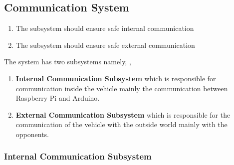 \documentclass[a4paper,12pt]{article}
\begin{document}

\subsection{Communication System}



	\begin{enumerate}
		\item The subsystem should ensure safe internal communication
		\item The subsystem should ensure safe external communication
	\end{enumerate}	


	The system has two subsystems namely, 	,

	\begin{enumerate}
		\item \textbf{Internal Communication Subsystem} which is responsible for communication inside the vehicle mainly the communication between Raspberry Pi and Arduino.						
		\item \textbf{External Communication Subsystem} which is responsible for the communication of the vehicle with the outside world mainly with the opponents.
	\end{enumerate}		


\subsubsection{Internal Communication Subsystem}
\end{document}
